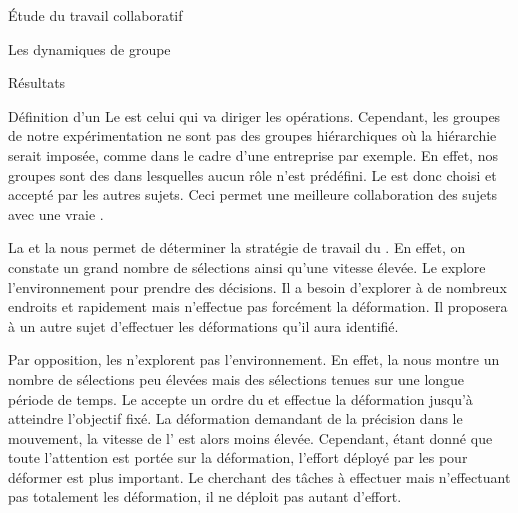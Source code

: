 \documentclass[myfrancais]{mythesis}
\begin{document}
\begin{mypart}{Étude du travail collaboratif}
\begin{mychapter}{Les dynamiques de groupe}
\begin{mysection}{Résultats}
\begin{mysubsection}{Définition d'un }
					Le  est celui qui va diriger les opérations.
					Cependant, les groupes de notre expérimentation ne sont pas des groupes hiérarchiques où la hiérarchie serait imposée, comme dans le cadre d'une entreprise par exemple.
					En effet, nos groupes sont des  dans lesquelles aucun rôle n'est prédéfini.
					Le  est donc choisi et accepté par les autres sujets.
					Ceci permet une meilleure collaboration des sujets avec une vraie .

					La  et la  nous permet de déterminer la stratégie de travail du .
					En effet, on constate un grand nombre de sélections ainsi qu'une vitesse élevée.
					Le  explore l'environnement pour prendre des décisions.
					Il a besoin d'explorer à de nombreux endroits et rapidement mais n'effectue pas forcément la déformation.
					Il proposera à un autre sujet d'effectuer les déformations qu'il aura identifié.

					Par opposition, les  n'explorent pas l'environnement.
					En effet, la  nous montre un nombre de sélections peu élevées mais des sélections tenues sur une longue période de temps.
					Le  accepte un ordre du  et effectue la déformation jusqu'à atteindre l'objectif fixé.
					La déformation demandant de la précision dans le mouvement, la vitesse de l' est alors moins élevée.
					Cependant, étant donné que toute l'attention est portée sur la déformation, l'effort déployé par les  pour déformer est plus important.
					Le  cherchant des tâches à effectuer mais n'effectuant pas totalement les déformation, il ne déploit pas autant d'effort.


\end{mysubsection}
\end{mysection}
\end{mychapter}
\end{mypart}
\end{document}
